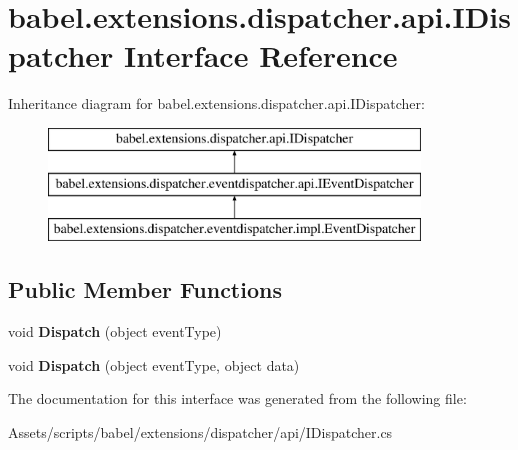 \hypertarget{interfacebabel_1_1extensions_1_1dispatcher_1_1api_1_1_i_dispatcher}{\section{babel.\-extensions.\-dispatcher.\-api.\-I\-Dispatcher Interface Reference}
\label{interfacebabel_1_1extensions_1_1dispatcher_1_1api_1_1_i_dispatcher}
}
Inheritance diagram for babel.\-extensions.\-dispatcher.\-api.\-I\-Dispatcher\-:\begin{figure}[H]
\begin{center}
\leavevmode
\includegraphics[height=3.000000cm]{interfacebabel_1_1extensions_1_1dispatcher_1_1api_1_1_i_dispatcher}
\end{center}
\end{figure}
\subsection*{Public Member Functions}
\begin{DoxyCompactItemize}
\item 
\hypertarget{interfacebabel_1_1extensions_1_1dispatcher_1_1api_1_1_i_dispatcher_aef13e28dbeb27ac9421d89d5297a1aef}{void {\bfseries Dispatch} (object event\-Type)}\label{interfacebabel_1_1extensions_1_1dispatcher_1_1api_1_1_i_dispatcher_aef13e28dbeb27ac9421d89d5297a1aef}

\item 
\hypertarget{interfacebabel_1_1extensions_1_1dispatcher_1_1api_1_1_i_dispatcher_aa4a78e9cdc5e87440481ba405e0af521}{void {\bfseries Dispatch} (object event\-Type, object data)}\label{interfacebabel_1_1extensions_1_1dispatcher_1_1api_1_1_i_dispatcher_aa4a78e9cdc5e87440481ba405e0af521}

\end{DoxyCompactItemize}


The documentation for this interface was generated from the following file\-:\begin{DoxyCompactItemize}
\item 
Assets/scripts/babel/extensions/dispatcher/api/I\-Dispatcher.\-cs\end{DoxyCompactItemize}
